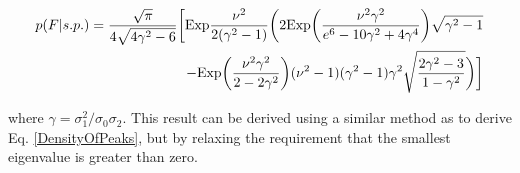 \documentclass[12pt]{article}
\begin{document}
\begin{equation}
\begin{split}
p(F|s.p.)=\frac{\sqrt{\pi}}{4\sqrt{4\gamma^2-6}}\bigg{[}\mathrm{Exp}\frac{\nu^2}{2(\gamma^2-1)}\bigg{(}2\mathrm{Exp}\bigg{(}\frac{\nu^2\gamma^2}{e^6-10\gamma^2+4\gamma^4}\bigg{)}\sqrt{\gamma^2-1}\\
-\mathrm{Exp}\bigg{(}\frac{\nu^2\gamma^2}{2-2\gamma^2}\bigg{)}(\nu^2-1)(\gamma^2-1)\gamma^2\sqrt{\frac{2\gamma^2-3}{1-\gamma^2}}\bigg{)}\bigg{]}
\end{split}
\end{equation}

\noindent where $\gamma = \sigma_1^2/\sigma_0\sigma_2$. This result can be derived using a similar method as to derive Eq. \ref{DensityOfPeaks}, but by relaxing the requirement that the smallest eigenvalue is greater than zero.
\end{document}
